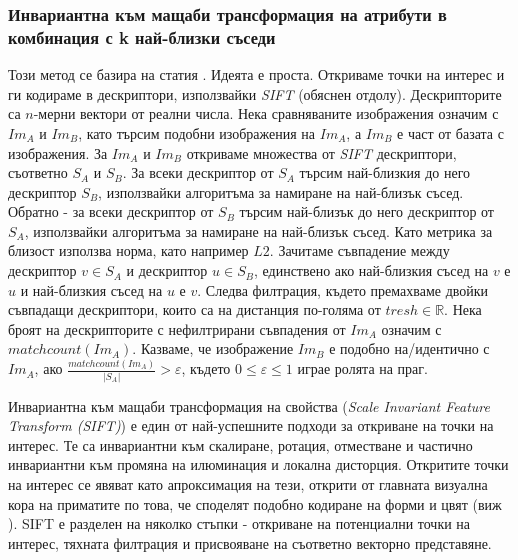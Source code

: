 \documentclass[a4paper,12pt]{article}
\begin{document}
\subsubsection{Инвариантна към мащаби трансформация на атрибути в комбинация с k най-близки съседи}

Този метод се базира на статия \cite{sift}. Идеята е проста. Откриваме точки на интерес и ги кодираме в дескриптори, използвайки \textit{SIFT} (обяснен отдолу). Дескрипторите са $n$-мерни вектори от реални числа. Нека сравняваните изображения означим с $Im_A$ и $Im_B$, като търсим подобни изображения на $Im_A$, а $Im_B$ е част от базата с изображения. За $Im_A$ и $Im_B$ откриваме множества от \textit{SIFT} дескриптори, съответно $S_A$ и $S_B$. За всеки дескриптор от $S_A$ търсим най-близкия до него дескриптор $S_B$, използвайки алгоритъма за намиране на най-близък съсед. Обратно - за всеки дескриптор от $S_B$ търсим най-близък до него дескриптор от $S_A$, използвайки алгоритъма за намиране на най-близък съсед. Като метрика за близост използва норма, като например $L2$. Зачитаме съвпадение между дескриптор $v \in S_A$ и дескриптор $u \in S_B$, единствено ако най-близкия съсед на $v$ е $u$ и най-близкия съсед на $u$ е $v$. Следва филтрация, където премахваме двойки съвпадащи дескриптори, които са на дистанция по-голяма от $tresh \in \mathbb{R}$. Нека броят на дескрипторите с нефилтрирани съвпадения от $Im_A$ означим с $matchcount(Im_A)$. Казваме, че изображение $Im_B$ е подобно на/идентично с $Im_A$, ако $\frac{matchcount(Im_A)}{|S_A|} > \varepsilon$, където $0 \leq \varepsilon \leq 1$ играе ролята на праг.

\bigbreak

Инвариантна към мащаби трансформация на свойства (\textit{Scale Invariant Feature Transform (SIFT)}) е един от най-успешните подходи за откриване на точки на интерес. Те са инвариантни към скалиране, ротация, отместване и частично инвариантни към промяна на илюминация и локална дисторция.  Откритите точки на интерес се явяват като апроксимация на тези, открити от главната визуална кора на приматите по това, че споделят подобно кодиране на форми и цвят (виж \cite{primatevisualcortex}). SIFT е разделен на няколко стъпки - откриване на потенциални точки на интерес, тяхната филтрация и присвояване на съответно векторно представяне.

\bigbreak
\end{document}
